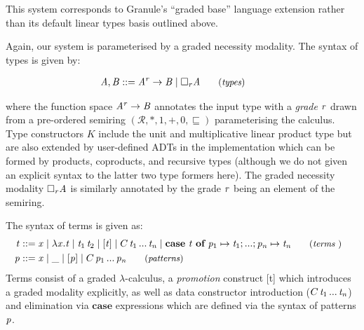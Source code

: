 This system corresponds to Granule's ``graded base'' language extension rather than its
default linear types basis outlined above.

Again, our system is parameterised by a graded necessity modality. The syntax of types is given by:

\begin{align*}
\hspace{-0.9em}\GRANULEnt{A} , \GRANULEnt{B} & ::=
       \GRANULEnt{A} ^ \GRANULEnt{r}  \rightarrow  \GRANULEnt{B}
  \mid \Box_{  \GRANULEnt{r}  }  \GRANULEnt{A}
{\small{\tag{\textit{types}}}}
\end{align*}


where the function space $\mathit{A} ^ {\mathit{r}}  \rightarrow  \mathit{B}$ annotates the input type with a \emph{grade} $\mathit{r}$
drawn from a pre-ordered semiring $(\mathcal{R}, {\ast}, {1}, {+}, {0}, \sqsubseteq)$ parameterising
the calculus. Type constructors $K$ include the unit and multiplicative linear product type but
are also extended by user-defined ADTs in the implementation which can be formed by products, coproducts,
and recursive types (although we do not given an explicit syntax to the latter two type formers here).
The graded necessity modality $\Box_{  \mathit{r}  }  \mathit{A}$ is similarly annotated by the grade $\mathit{r}$ being
an element of the semiring. %



The syntax of terms is given as:
%
\begin{align*}
\hspace{-0.8em} \GRANULEnt{t} ::= \;
       & \GRANULEmv{x}
  \mid \lambda  \GRANULEmv{x}  .  \GRANULEnt{t}
  \mid \GRANULEnt{t_{{\mathrm{1}}}} \, \GRANULEnt{t_{{\mathrm{2}}}}
  \mid \GRANULEsym{[}  \GRANULEnt{t}  \GRANULEsym{]}
  \mid C \, \GRANULEnt{t_{{\mathrm{1}}}} \, ... \, \GRANULEnt{t_{\GRANULEmv{n}}}
  \mid \textbf{case} \  \GRANULEnt{t}  \ \textbf{of} \   \GRANULEnt{p_{{\mathrm{1}}}}  \mapsto  \GRANULEnt{t_{{\mathrm{1}}}} ; ... ;  \GRANULEnt{p_{\GRANULEmv{n}}}  \mapsto  \GRANULEnt{t_{\GRANULEmv{n}}}
{\small{\tag{\textit{terms} }}}
         \\
\hspace{-0.8em} \GRANULEnt{p} ::= \;
       & \GRANULEmv{x}
  \mid \_
  \mid \GRANULEsym{[}  \GRANULEnt{p}  \GRANULEsym{]}
  \mid C \, \GRANULEnt{p_{{\mathrm{1}}}} \, ... \, \GRANULEnt{p_{\GRANULEmv{n}}}
{\small{\tag{\textit{patterns}}}}
\end{align*}
%
Terms consist of a graded $\lambda$-calculus, a \textit{promotion} construct [t] which introduces a graded modality explicitly, as well as data constructor introduction ($C \, \mathit{t_{{\mathrm{1}}}} \, ... \, \mathit{t_{\mathit{n}}}$) and elimination via
 $\textbf{case}$ expressions which are defined via the syntax of patterns $\mathit{p}$.



